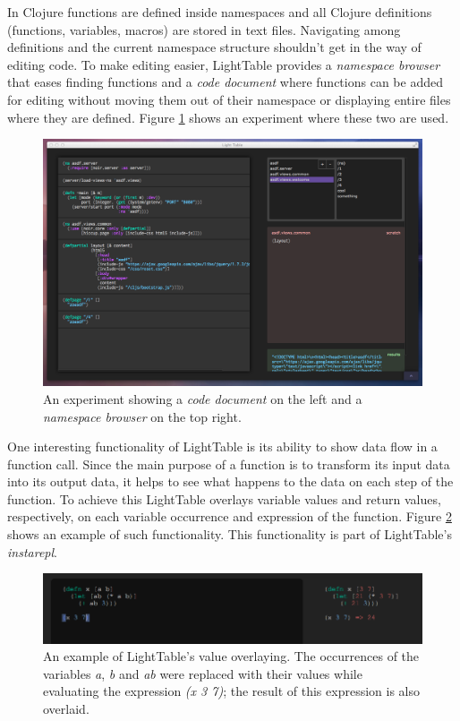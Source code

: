 \documentclass{./llncs2e/llncs}
\begin{document}
	In Clojure functions are defined inside namespaces and all Clojure definitions (functions, variables, macros) are stored in text files. 
	Navigating among definitions and the current namespace structure shouldn't get in the way of editing code. 
	To make editing easier, LightTable provides a \emph{namespace browser} that eases finding functions and a \emph{code document} where functions can be added for editing without moving them out of their namespace or displaying entire files where they are defined. 
	Figure \ref{fig:lt:clojure:table} shows an experiment where these two are used.

	\begin{figure}
	  \centering
	  \includegraphics[width=1.0\textwidth]{img/lt_clojure_table}
	    \caption{An experiment showing a \emph{code document} on the left and a \emph{namespace browser} on the top right.}
	  \label{fig:lt:clojure:table}
	\end{figure} 

	One interesting functionality of LightTable is its ability to show data flow in a function call. 
	Since the main purpose of a function is to transform its input data into its output data, it helps to see what happens to the data on each step of the function. 
	To achieve this LightTable overlays variable values and return values, respectively, on each variable occurrence and expression of the function. 
	Figure \ref{fig:lt:val:overlay} shows an example of such functionality. 
	This functionality is part of LightTable's \emph{instarepl}.

	\begin{figure}
		\centering
		\includegraphics[width=1.0\textwidth]{img/lt_val_overlay}
			\caption{An example of LightTable's value overlaying. The occurrences of the variables \emph{a}, \emph{b} and \emph{ab} were replaced with their values while evaluating the expression \emph{(x 3 7)}; the result of this expression is also overlaid.}
		\label{fig:lt:val:overlay}
	\end{figure}
\end{document}
